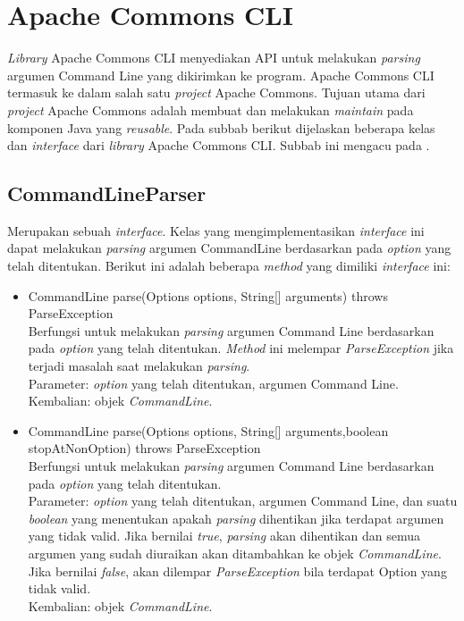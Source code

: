 \section{Apache Commons CLI}
\label{subsec:apache_cli}
\textit{Library} Apache Commons CLI menyediakan API untuk melakukan \textit{parsing} argumen Command Line yang dikirimkan ke program\cite{Apache_Commons_CLI}. Apache Commons CLI termasuk ke dalam salah satu \textit{project} Apache Commons. Tujuan utama dari \textit{project} Apache Commons adalah membuat dan melakukan \textit{maintain} pada komponen Java yang \textit{reusable}. Pada subbab berikut dijelaskan beberapa kelas dan \textit{interface} dari \textit{library} Apache Commons CLI. Subbab ini mengacu pada \cite{Apache_java_doc}.

\subsection{CommandLineParser}
\label{subsec:commandlineparser}
Merupakan sebuah \textit{interface}. Kelas yang mengimplementasikan \textit{interface} ini dapat melakukan \textit{parsing} argumen CommandLine berdasarkan pada \textit{option} yang telah ditentukan. Berikut ini adalah beberapa \textit{method} yang dimiliki \textit{interface} ini: 
\begin{itemize}
\item CommandLine parse(Options options, String[] arguments) throws ParseException\\
Berfungsi untuk melakukan \textit{parsing} argumen Command Line berdasarkan pada \textit{option} yang telah ditentukan. \textit{Method} ini melempar \textit{ParseException} jika terjadi masalah saat melakukan \textit{parsing}.\\
Parameter: \textit{option} yang telah ditentukan, argumen Command Line.\\
Kembalian: objek \textit{CommandLine}.

\item CommandLine parse(Options options, String[] arguments,boolean stopAtNonOption) throws ParseException\\
Berfungsi untuk melakukan \textit{parsing} argumen Command Line berdasarkan pada \textit{option} yang telah ditentukan.\\
Parameter: \textit{option} yang telah ditentukan, argumen Command Line, dan suatu \textit{boolean} yang menentukan apakah \textit{parsing} dihentikan jika terdapat argumen yang tidak valid. Jika bernilai \textit{true}, \textit{parsing} akan dihentikan dan semua argumen yang sudah diuraikan akan ditambahkan ke objek \textit{CommandLine}. Jika bernilai \textit{false}, akan dilempar \textit{ParseException} bila terdapat Option yang tidak valid.\\
Kembalian: objek \textit{CommandLine}.
\end{itemize}


